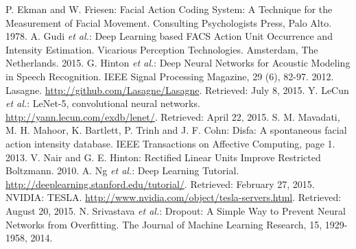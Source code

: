 \documentclass{ws-procs9x6}
\begin{document}

\begin{thebibliography}{99}
 P. Ekman and W. Friesen: Facial Action Coding System: A Technique for the Measurement of Facial Movement. Consulting Psychologists Press, Palo Alto. 1978.
 A. Gudi \textit{et al.}: Deep Learning based FACS Action Unit Occurrence and Intensity Estimation. Vicarious Perception Technologies. Amsterdam, The Netherlands. 2015.
 G. Hinton \textit{et al.}: Deep Neural Networks for Acoustic Modeling in Speech Recognition. IEEE Signal Processing Magazine, 29 (6), 82-97. 2012.
 Lasagne. \url{http://github.com/Lasagne/Lasagne}. Retrieved: July 8, 2015.
 Y. LeCun \textit{et al.}: LeNet-5, convolutional neural networks. \url{http://yann.lecun.com/exdb/lenet/}. Retrieved: April 22, 2015.
 S. M. Mavadati, M. H. Mahoor, K. Bartlett, P. Trinh and J. F. Cohn: Disfa: A spontaneous facial action intensity database. IEEE Transactions on Affective Computing, page 1. 2013.
 V. Nair and G. E. Hinton: Rectified Linear Units Improve Restricted Boltzmann. 2010.
 A. Ng \textit{et al.}: Deep Learning Tutorial. \url{http://deeplearning.stanford.edu/tutorial/}. Retrieved: February 27, 2015.
 NVIDIA: TESLA. \url{http://www.nvidia.com/object/tesla-servers.html}. Retrieved: August 20, 2015.
 N. Srivastava \textit{et al.}: Dropout: A Simple Way to Prevent Neural Networks from Overfitting. The Journal of Machine Learning Research, 15, 1929-1958, 2014.
\end{thebibliography}
\end{document}
